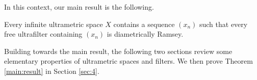 In this context, our main result is the following.
\begin{theorem}
\label{main:result}
Every infinite ultrametric space \( X \) contains a sequence \( (x_{n}) \) such that every free ultrafilter containing \( (x_{n}) \) is diametrically Ramsey.
\end{theorem}

Building towards the main result, the following two sections review some elementary properties of ultrametric spaces and filters. We then prove Theorem \ref{main:result} in Section \ref{sec:4}.
